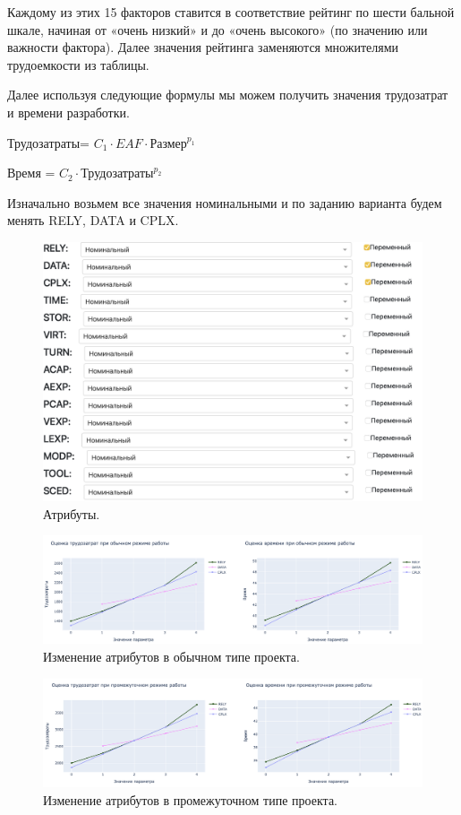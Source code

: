 \documentclass[a4paper,14pt]{extreport} %
\begin{document}
\begin{enumerate}
Каждому из этих 15 факторов ставится в соответствие рейтинг по шести бальной шкале, начиная от «очень низкий» и до «очень высокого» (по значению или важности фактора). Далее значения рейтинга заменяются множителями трудоемкости из таблицы.

Далее используя следующие формулы мы можем получить значения трудозатрат и времени разработки.

Трудозатраты= $C_1\cdot EAF \cdot \text{Размер}^{p_1}$

Время = $C_2 \cdot \text{Трудозатраты}^{p_2}$

Изначально возьмем все значения номинальными и по заданию варианта будем менять RELY, DATA и CPLX.

\begin{figure}[H]
  \centering
  \caption{Атрибуты. }
  \includegraphics[scale=0.5]{table}
\end{figure}

\begin{figure}[H]
  \centering
  \caption{Изменение атрибутов в обычном типе проекта. }
  \includegraphics[scale=0.4]{norma}
\end{figure}

\begin{figure}[H]
  \centering
  \caption{Изменение атрибутов в промежуточном типе проекта. }
  \includegraphics[scale=0.4]{interm}
\end{figure}


\end{enumerate}
\end{document}
